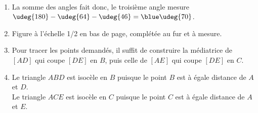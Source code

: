    \ \\ [-5mm]
    \begin{enumerate}
      \item La somme des angles fait  donc, le troisième angle mesure $\udeg{180}-\udeg{64}-\udeg{46} =\blue\udeg{70}$.
      \item Figure à l'échelle 1/2 en bas de page, complétée au fur et à mesure.
      \item Pour tracer les points demandés, il suffit de construire la médiatrice de $[AD]$ qui coupe $[DE]$ en $B$, puis celle de $[AE]$ qui coupe $[DE]$ en $C$.
      \item {\blue Le triangle $ABD$ est isocèle en $B$} puisque le point $B$ est à égale distance de $A$ et $D$. \\
         {\blue Le triangle $ACE$ est isocèle en $C$} puisque le point $C$ est à égale distance de $A$ et $E$.
   \end{enumerate}

\Coupe

